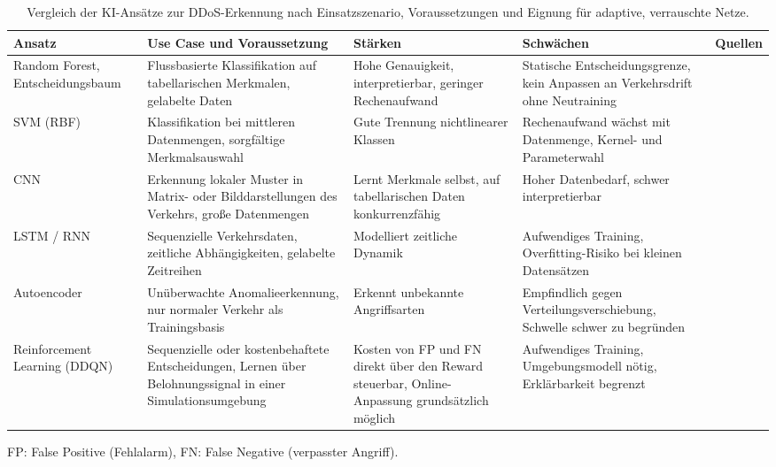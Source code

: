 \begin{table}[htbp]
	\centering
	\footnotesize
	\setlength{\tabcolsep}{3pt}
	\renewcommand{\arraystretch}{1.25}
	\caption[Vergleich der KI-Ansätze zur DDoS-Erkennung]{Vergleich der KI-Ansätze zur DDoS-Erkennung nach Einsatzszenario, Voraussetzungen und Eignung für adaptive, verrauschte Netze.}
	\label{tab:ki_vergleich}
	\begin{tabular}{L{0.13\textwidth}L{0.22\textwidth}L{0.19\textwidth}L{0.21\textwidth}L{0.15\textwidth}}
		\toprule
		\textbf{Ansatz} & \textbf{Use Case und Voraussetzung} & \textbf{Stärken} & \textbf{Schwächen} & \textbf{Quellen} \\
		\midrule
		Random Forest, Entscheidungsbaum & Flussbasierte Klassifikation auf tabellarischen Merkmalen, gelabelte Daten & Hohe Genauigkeit, interpretierbar, geringer Rechenaufwand & Statische Entscheidungsgrenze, kein Anpassen an Verkehrsdrift ohne Neutraining & \autocite{koComparativeStudyAIEnabled2023, razaFeatureSelectionBasedDDoSAttack2024} \\
		SVM (RBF) & Klassifikation bei mittleren Datenmengen, sorgfältige Merkmalsauswahl & Gute Trennung nichtlinearer Klassen & Rechenaufwand wächst mit Datenmenge, Kernel- und Parameterwahl & \autocite{balaAITechniquesIoTbased2024, razaFeatureSelectionBasedDDoSAttack2024} \\
		CNN & Erkennung lokaler Muster in Matrix- oder Bilddarstellungen des Verkehrs, große Datenmengen & Lernt Merkmale selbst, auf tabellarischen Daten konkurrenzfähig & Hoher Datenbedarf, schwer interpretierbar & \autocite{razaFeatureSelectionBasedDDoSAttack2024, balaAITechniquesIoTbased2024} \\
		LSTM / RNN & Sequenzielle Verkehrsdaten, zeitliche Abhängigkeiten, gelabelte Zeitreihen & Modelliert zeitliche Dynamik & Aufwendiges Training, Overfitting-Risiko bei kleinen Datensätzen & \autocite{balaAITechniquesIoTbased2024, kumarComprehensiveReviewVulnerabilities2024} \\
		Autoencoder & Unüberwachte Anomalieerkennung, nur normaler Verkehr als Trainingsbasis & Erkennt unbekannte Angriffsarten & Empfindlich gegen Verteilungsverschiebung, Schwelle schwer zu begründen & \autocite{balaAITechniquesIoTbased2024, kumarComprehensiveReviewVulnerabilities2024} \\
		\hspace{0pt}Reinforcement Learning (DDQN) & Sequenzielle oder kostenbehaftete Entscheidungen, Lernen über Belohnungssignal in einer Simulationsumgebung & Kosten von FP und FN direkt über den Reward steuerbar, Online-Anpassung grundsätzlich möglich & Aufwendiges Training, Umgebungsmodell nötig, Erklärbarkeit begrenzt & \autocite{lopez-martinApplicationDeepReinforcement2020, camineroAdversarialEnvironmentReinforcement2019} \\
		\bottomrule
	\end{tabular}

	\smallskip
	{\scriptsize FP: False Positive (Fehlalarm), FN: False Negative (verpasster Angriff).\par}
\end{table}

